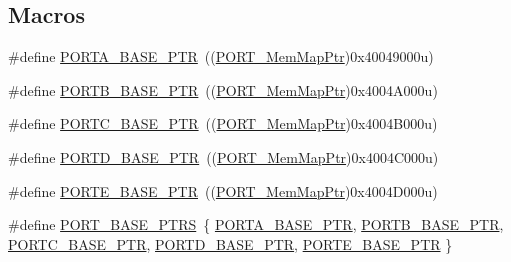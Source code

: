 \subsection*{Macros}
\begin{DoxyCompactItemize}
\item 
\#define \hyperlink{group___p_o_r_t___peripheral_gaa18ec7594fe603225220ec6eda4a19ce}{P\+O\+R\+T\+A\+\_\+\+B\+A\+S\+E\+\_\+\+P\+T\+R}~((\hyperlink{group___p_o_r_t___peripheral_ga0e26bafb7c17808f90278627bcbcaf8c}{P\+O\+R\+T\+\_\+\+Mem\+Map\+Ptr})0x40049000u)
\item 
\#define \hyperlink{group___p_o_r_t___peripheral_ga585b4782d1ceb44492289af0019480f9}{P\+O\+R\+T\+B\+\_\+\+B\+A\+S\+E\+\_\+\+P\+T\+R}~((\hyperlink{group___p_o_r_t___peripheral_ga0e26bafb7c17808f90278627bcbcaf8c}{P\+O\+R\+T\+\_\+\+Mem\+Map\+Ptr})0x4004\+A000u)
\item 
\#define \hyperlink{group___p_o_r_t___peripheral_ga03c740cdda17711afafc932723871474}{P\+O\+R\+T\+C\+\_\+\+B\+A\+S\+E\+\_\+\+P\+T\+R}~((\hyperlink{group___p_o_r_t___peripheral_ga0e26bafb7c17808f90278627bcbcaf8c}{P\+O\+R\+T\+\_\+\+Mem\+Map\+Ptr})0x4004\+B000u)
\item 
\#define \hyperlink{group___p_o_r_t___peripheral_ga7f5a263751543810ebfdbde278383276}{P\+O\+R\+T\+D\+\_\+\+B\+A\+S\+E\+\_\+\+P\+T\+R}~((\hyperlink{group___p_o_r_t___peripheral_ga0e26bafb7c17808f90278627bcbcaf8c}{P\+O\+R\+T\+\_\+\+Mem\+Map\+Ptr})0x4004\+C000u)
\item 
\#define \hyperlink{group___p_o_r_t___peripheral_gab166fe285bbb15b52de610f408fe25d3}{P\+O\+R\+T\+E\+\_\+\+B\+A\+S\+E\+\_\+\+P\+T\+R}~((\hyperlink{group___p_o_r_t___peripheral_ga0e26bafb7c17808f90278627bcbcaf8c}{P\+O\+R\+T\+\_\+\+Mem\+Map\+Ptr})0x4004\+D000u)
\item 
\#define \hyperlink{group___p_o_r_t___peripheral_ga54ff5179f8acaef2e1683cedfc0ef453}{P\+O\+R\+T\+\_\+\+B\+A\+S\+E\+\_\+\+P\+T\+R\+S}~\{ \hyperlink{group___p_o_r_t___peripheral_gaa18ec7594fe603225220ec6eda4a19ce}{P\+O\+R\+T\+A\+\_\+\+B\+A\+S\+E\+\_\+\+P\+T\+R}, \hyperlink{group___p_o_r_t___peripheral_ga585b4782d1ceb44492289af0019480f9}{P\+O\+R\+T\+B\+\_\+\+B\+A\+S\+E\+\_\+\+P\+T\+R}, \hyperlink{group___p_o_r_t___peripheral_ga03c740cdda17711afafc932723871474}{P\+O\+R\+T\+C\+\_\+\+B\+A\+S\+E\+\_\+\+P\+T\+R}, \hyperlink{group___p_o_r_t___peripheral_ga7f5a263751543810ebfdbde278383276}{P\+O\+R\+T\+D\+\_\+\+B\+A\+S\+E\+\_\+\+P\+T\+R}, \hyperlink{group___p_o_r_t___peripheral_gab166fe285bbb15b52de610f408fe25d3}{P\+O\+R\+T\+E\+\_\+\+B\+A\+S\+E\+\_\+\+P\+T\+R} \}
\end{DoxyCompactItemize}
